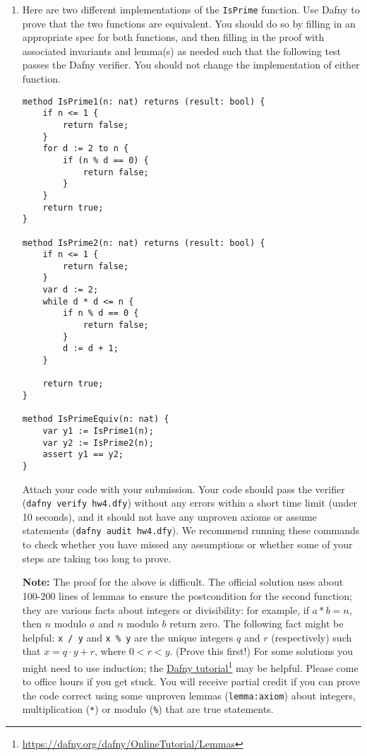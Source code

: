 \documentclass{article}
\newcommand{\visiblehref}[2]{\href{#1}{#2}\footnote{\url{#1}}}
\begin{document}
\begin{enumerate}
\item
Here are two different implementations of the \texttt{IsPrime} function.
Use Dafny to prove that the two functions are equivalent.
You should do so by filling in an appropriate spec for both functions,
and then filling in the proof with associated invariants and lemma(s) as needed
such that the following test passes the Dafny verifier.
You should not change the implementation of either function.

\begin{verbatim}
method IsPrime1(n: nat) returns (result: bool) {
    if n <= 1 {
        return false;
    }
    for d := 2 to n {
        if (n % d == 0) {
            return false;
        }
    }
    return true;
}

method IsPrime2(n: nat) returns (result: bool) {
    if n <= 1 {
        return false;
    }
    var d := 2;
    while d * d <= n {
        if n % d == 0 {
            return false;
        }
        d := d + 1;
    }

    return true;
}

method IsPrimeEquiv(n: nat) {
    var y1 := IsPrime1(n);
    var y2 := IsPrime2(n);
    assert y1 == y2;
}
\end{verbatim}

Attach your code with your submission.
Your code should pass the verifier (\texttt{dafny verify hw4.dfy}) without any errors
within a short time limit (under 10 seconds),
and it should not have any unproven axioms or assume statements (\texttt{dafny audit hw4.dfy}).
We recommend running these commands to check whether you have missed any assumptions or whether some of your steps are taking too long to prove.

\textbf{Note:}
The proof for the above is difficult.
The official solution uses about 100-200 lines of lemmas
to ensure the postcondition for the second function;
they are various facts about integers or divisibility:
for example, if $a * b = n$, then $n$ modulo $a$ and $n$ modulo $b$ return zero.
The following fact might be helpful: \texttt{x / y} and \texttt{x \% y} are the unique integers $q$ and $r$ (respectively) such that $x = q \cdot y + r$, where $0 < r < y$. (Prove this first!)
For some solutions you might need to use induction; the \visiblehref{https://dafny.org/dafny/OnlineTutorial/Lemmas}{Dafny tutorial} may be helpful.
Please come to office hours if you get stuck.
You will receive partial credit if you can prove the code correct using some unproven lemmas (\texttt{lemma{:axiom}}) about integers, multiplication (\texttt{*}) or modulo (\texttt{\%}) that are true statements.

\end{enumerate}
\end{document}
